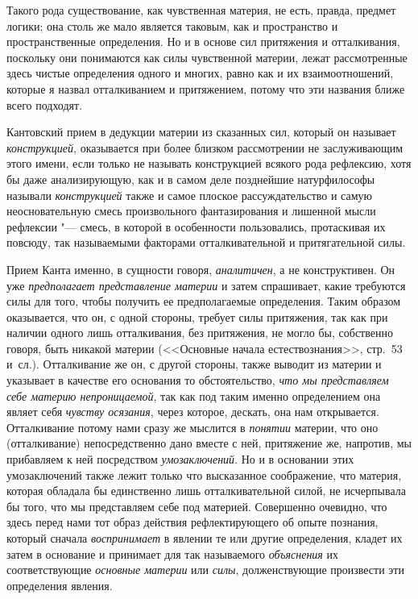 Такого рода существование, как чувственная материя, не есть, правда, предмет
логики; она столь же мало является таковым, как и пространство и
пространственные определения. Но и в основе сил притяжения и отталкивания,
поскольку они понимаются как силы чувственной материи, лежат рассмотренные
здесь чистые определения одного и многих, равно как и их взаимоотношений,
которые я назвал отталкиванием и притяжением, потому что эти названия ближе
всего подходят.

Кантовский прием в дедукции материи из сказанных сил, который он называет
{\em конструкцией}, оказывается при более близком
рассмотрении не заслуживающим этого имени, если только не называть
конструкцией всякого рода рефлексию, хотя бы даже анализирующую, как и в
самом деле позднейшие натурфилософы называли
{\em конструкцией} также и самое плоское
рассуждательство и самую неосновательную смесь произвольного фантазирования
и лишенной мысли рефлексии "--- смесь, в которой в особенности пользовались,
протаскивая их повсюду, так называемыми факторами отталкивательной и
притягательной силы.

Прием Канта именно, в сущности говоря, {\em аналитичен},
а не конструктивен. Он уже {\em предполагает
представление материи} и затем спрашивает, какие требуются силы для того,
чтобы получить ее предполагаемые определения. Таким образом оказывается,
что он, с одной стороны, требует силы притяжения, так как при наличии
одного лишь отталкивания, без притяжения, не могло бы, собственно говоря,
быть никакой материи (<<Основные начала естествознания>>, стр.~53 и~сл.).
Отталкивание же он, с другой стороны, также выводит из материи и указывает
в качестве его основания то обстоятельство, {\em что мы
представляем себе материю непроницаемой}, так как под таким именно
определением она являет себя {\em чувству осязания},
через которое, дескать, она нам открывается. Отталкивание потому нами сразу
же мыслится в {\em понятии} материи, что оно
(отталкивание) непосредственно дано вместе с ней, притяжение же, напротив,
мы прибавляем к ней посредством {\em умозаключений}. Но
и в основании этих умозаключений также лежит только что высказанное
соображение, что материя, которая обладала бы единственно лишь
отталкивательной силой, не исчерпывала бы того, что мы представляем себе
под материей. Совершенно очевидно, что здесь перед нами тот образ действия
рефлектирующего об опыте познания, который сначала
{\em воспринимает} в явлении те или другие определения,
кладет их затем в основание и принимает для так называемого
{\em объяснения} их соответствующие {\em основные материи} или
{\em силы}, долженствующие произвести эти определения явления.


